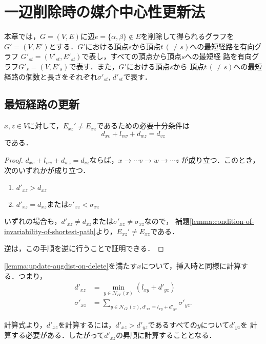 \section{一辺削除時の媒介中心性更新法}
\label{sect:update-bc-on-delete}
本章では，$G=(V,E)$に辺$e=\{\alpha,\beta\} \not\in E$を削除して得られるグラフを
$G'=(V,E')$とする．$G'$における頂点$s$から頂点$t\,(\neq s)$への最短経路を有向グラフ
$G'_{st}=(V'_{st},E'_{st})$で表し，すべての頂点から頂点$s$への最短経
路を有向グラフ$G'_s=(V,E'_s)$で表す．また，$G'$における頂点$s$から
頂点$t\,(\neq s)$への最短経路の個数と長さをそれぞれ$\sigma'_{st}$, 
$d'_{st}$で表す．

\subsection{最短経路の更新}
\label{subsect:update-augdist-on-delete}

\begin{lemma}
  \label{lemma:update-augdist-on-delete}
  $x,z\in V$に対して，$E_{xz}'\neq E_{xz}$であるための必要十分条件は
  \[ d_{xv}+l_{vw}+d_{wz}=d_{vz} \]
  である．
\end{lemma}
\begin{proof}
  $d_{xv}+l_{vw}+d_{wz}=d_{vz}$ならば，$x\rightarrow\cdots v\rightarrow w\rightarrow\cdots z$
  が成り立つ．このとき，次のいずれかが成り立つ．
  \begin{enumerate}
  \item $d'_{xz}>d_{xz}$
  \item $d'_{xz}=d_{xz}$または$\sigma'_{xz}<\sigma_{xz}$
  \end{enumerate}
  いずれの場合も，$d'_{xz}\neq d_{xz}$または$\sigma'_{xz}\neq\sigma_{xz}$なので，
  補題\ref{lemma:condition-of-invariability-of-shortest-path}より，$E_{xz}'\neq E_{xz}$である．

  逆は，この手順を逆に行うことで証明できる．
\end{proof}

\ref{lemma:update-augdist-on-delete}を満たす$x$について，挿入時と同様に計算する．つまり，
\begin{align*}
  d'_{xz}&=\min_{y\in\mathcal{N}_{G'}(x)}(l_{xy}+d'_{yz})\\
  \sigma'_{xz}&=\sum_{y\in\mathcal{N}_{G'}(x),d'_{xz}=l_{xy}+d'_{yz}}\sigma'_{yz}.
\end{align*}

計算式より，$d'_{xz}$を計算するには，$d'_{xz}>d'_{yz}$であるすべての$y$について$d'_{yz}$を
計算する必要がある．したがって$d'_{xz}$の昇順に計算することとなる．

